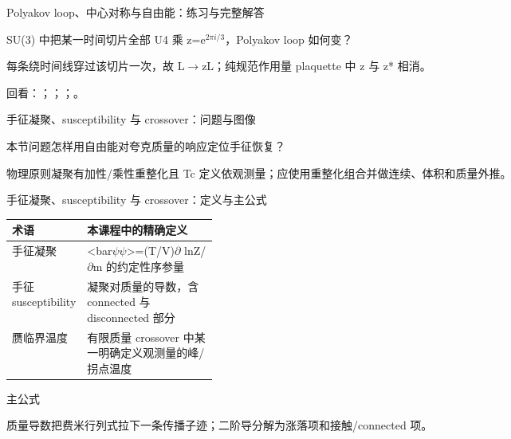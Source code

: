 \begin{frame}[t]{Polyakov loop、中心对称与自由能：练习与完整解答}
\footnotesize
\begin{block}{}SU(3) 中把某一时间切片全部 U4 乘 z=e\ensuremath{^{2\pi{}i/3}}，Polyakov loop 如何变？\end{block}
\begin{exampleblock}{}每条绕时间线穿过该切片一次，故 L\ensuremath{\rightarrow}zL；纯规范作用量 plaquette 中 z 与 z* 相消。\end{exampleblock}
\vfill
\scriptsize 回看：；；；。
\end{frame}

\begin{frame}[t]{手征凝聚、susceptibility 与 crossover：问题与图像}
\footnotesize
\begin{block}{本节问题}怎样用自由能对夸克质量的响应定位手征恢复？\end{block}
\begin{block}{物理原则}\quad 凝聚有加性/\allowbreak{}乘性重整化且 Tc 定义依观测量；应使用重整化组合并做连续、体积和质量外推。\end{block}
\end{frame}

\begin{frame}[t]{手征凝聚、susceptibility 与 crossover：定义与主公式}
\footnotesize\begin{tabularx}{\linewidth}{p{0.30\linewidth}Y}
\toprule 术语 & 本课程中的精确定义\\\midrule
{} 手征凝聚 & <bar\ensuremath{\psi}\ensuremath{\psi}>=(T/\allowbreak{}V)\ensuremath{\partial} lnZ/\allowbreak{}\ensuremath{\partial}m 的约定性序参量\\
 手征 susceptibility & 凝聚对质量的导数，含 connected 与 disconnected 部分\\
 赝临界温度 & 有限质量 crossover 中某一明确定义观测量的峰/\allowbreak{}拐点温度\\
\bottomrule\end{tabularx}\vspace{0.15cm}
\begin{block}{ 主公式}\centering{}\end{block}
质量导数把费米行列式拉下一条传播子迹；二阶导分解为涨落项和接触/\allowbreak{}connected 项。
\end{frame}

